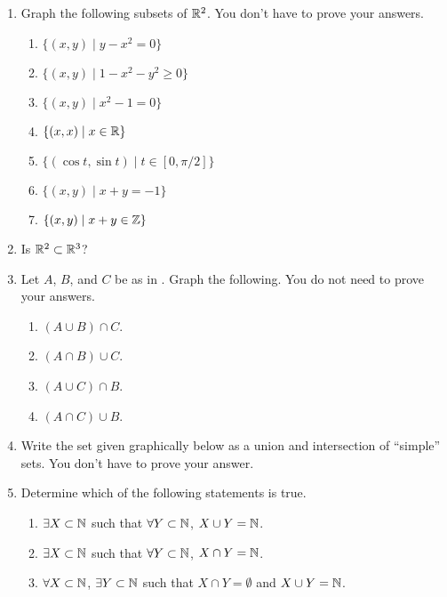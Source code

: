 \begin{enumerate}
    \item Graph the following subsets of $\mathbb{R}^2$. You don't have to prove your answers.
  \begin{enumerate}
      \item $\{(x, y) \mid y - x^2 = 0\}$
      \item $\{(x, y) \mid 1 - x^2 - y^2 \geq 0\}$
      \item $\{(x, y) \mid x^2 - 1 = 0\}$
      \item $\{(x, x) \mid x \in \mathbb{R}\}$
      \item $\{(\cos t, \sin t) \mid t \in [0, \pi/2]\}$
      \item $\{(x, y) \mid x + y = -1\}$
      \item $\{(x, y) \mid x + y \in \mathbb{Z}\}$
  \end{enumerate}

    \item Is $\mathbb{R}^2 \subset \mathbb{R}^3$?

    \item Let $A$, $B$, and $C$ be as in . Graph the following. You do not need to prove your answers.
  \begin{enumerate}
      \item $(A \cup B) \cap C$.
      \item $(A \cap B) \cup C$.
      \item $(A \cup C) \cap B$.
      \item $(A \cap C) \cup B$.
  \end{enumerate}

    \item Write the set given graphically below as a union and intersection of ``simple'' sets. You don't have to prove your answer.
    \begin{center}
  \end{center}


    \item Determine which of the following statements is true.
  \begin{enumerate}
      \item $\exists X \subset \mathbb{N}$ such that $\forall Y \subset \mathbb{N}$, $X \cup Y= \mathbb{N}$.
      \item $\exists X \subset \mathbb{N}$ such that $\forall Y \subset \mathbb{N}$, $X \cap Y= \mathbb{N}$.
      \item $\forall X \subset \mathbb{N}$, $\exists Y \subset \mathbb{N}$ such that $X \cap Y = \emptyset$ and $X \cup Y = \mathbb{N}$.
  \end{enumerate}


\end{enumerate}
